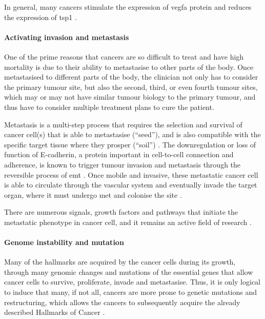 In general, many cancers stimulate the expression of \gls{vegfa} protein and reduces the expression of \gls{tsp1} \citep{Kazerounian2008}.

\paragraph{Activating invasion and metastasis}

\noindent
One of the prime reasons that cancers are so difficult to treat and have high mortality is due to their ability to metastasise to other parts of the body.
Once metastasised to different parts of the body, the clinician not only has to consider the primary tumour site, but also the second, third, or even fourth tumour sites, which may or may not have similar tumour biology to the primary tumour, and thus have to consider multiple treatment plans to cure the patient.

Metastasis is a multi-step process that requires the selection and survival of cancer cell(s) that is able to metastasise (``seed''), and is also compatible with the specific target tissue where they prosper (``soil'') \citep{Talmadge2010}.
The downregulation or loss of function of E-cadherin, a protein important in cell-to-cell connection and adherence, is known to trigger tumour invasion and metastasis through the reversible process of \gls{emt} \citep{Hanahan2011,Kalluri2009}.
Once mobile and invasive, these metastatic cancer cell is able to circulate through the vascular system and eventually invade the target organ, where it must undergo \gls{met} and colonise the site \citep{Hanahan2011,Kalluri2009}.

There are numerous signals, growth factors and pathways that initiate the metastatic phenotype in cancer cell, and it remains an active field of research \citep{Hanahan2011,Kalluri2009}.

\paragraph{Genome instability and mutation}

\noindent
Many of the hallmarks are acquired by the cancer cells during its growth, through many genomic changes and mutations of the essential genes that allow cancer cells to survive, proliferate, invade and metastasise.
Thus, it is only logical to induce that many, if not all, cancers are more prone to genetic mutations and restructuring, which allows the cancers to subsequently acquire the already described Hallmarks of Cancer \citep{Hanahan2011}.

